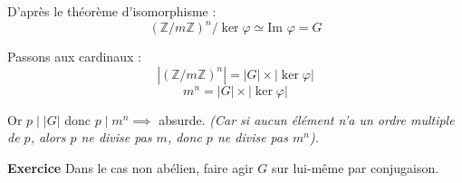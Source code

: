 D'après le théorème d'isomorphisme :
\[ (\mathbb{Z}/m\mathbb{Z})^n / \ker \varphi \simeq \text{Im } \varphi = G \]

Passons aux cardinaux :
\[ |(\mathbb{Z}/m\mathbb{Z})^n| = |G| \times |\ker \varphi| \]
\[ m^n = |G| \times |\ker \varphi| \]

Or $p \mid |G|$ donc $p \mid m^n \implies$ absurde.
\textit{(Car si aucun élément n'a un ordre multiple de $p$, alors $p$ ne divise pas $m$, donc $p$ ne divise pas $m^n$).}

\vspace{1cm}

\begin{exemple}
    \textbf{Exercice}
Dans le cas non abélien, faire agir $G$ sur lui-même par conjugaison.
\end{exemple}